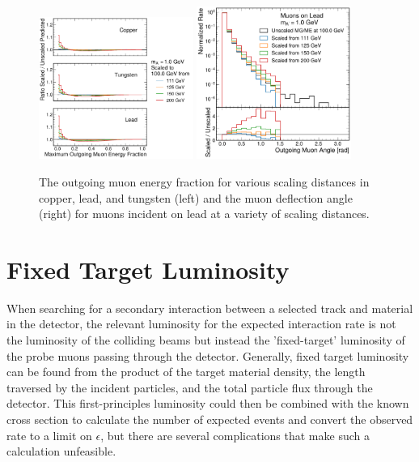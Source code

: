 \begin{figure}[!htbp]
    \centering
    \includegraphics[width=0.45\textwidth]{figures/muon_efrac_cumulative_ratio.pdf}
    \hspace{0.01\textwidth}
    \includegraphics[width=0.45\textwidth]{figures/muon_lead_ang.pdf}
    \caption[
        Validation of simulated \dbrem kinematics.
    ]{
        The outgoing muon energy fraction for various scaling distances in copper, lead, and tungsten (left) and the muon deflection angle (right) for muons incident on lead at a variety of scaling distances.
    }
    \label{fig:dbrem_validation}
\end{figure}

\section{Fixed Target Luminosity}
\label{sec:fixedLumi}
When searching for a secondary interaction between a selected track and material in the detector, the relevant luminosity for the expected interaction rate is not the luminosity of the colliding beams but instead the 'fixed-target' luminosity of the probe muons passing through the detector.
Generally, fixed target luminosity can be found from the product of the target material density, the length traversed by the incident particles, and the total particle flux through the detector.
This first-principles luminosity could then be combined with the known \dbrem cross section to calculate the number of expected events and convert the observed rate to a limit on $\epsilon$, but there are several complications that make such a calculation unfeasible.

